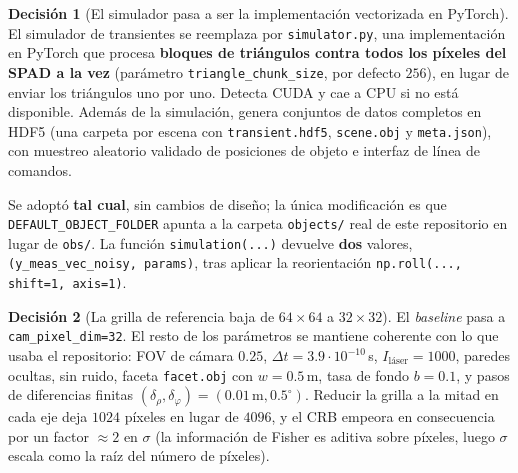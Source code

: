 \documentclass[11pt,a4paper]{article}
\newcommand{\code}[1]{\texttt{#1}}
\theoremstyle{definition}
\newtheorem{decision}{Decisión}
\begin{document}
\begin{decision}[El simulador pasa a ser la implementación vectorizada en
PyTorch]
\label{dec:simulador}
El simulador de transientes se reemplaza por \code{simulator.py}, una
implementación en PyTorch que procesa \textbf{bloques de triángulos contra
todos los píxeles del SPAD a la vez} (parámetro
\code{triangle\_chunk\_size}, por defecto $256$), en lugar de enviar los
triángulos uno por uno. Detecta CUDA y cae a CPU si no está disponible. Además
de la simulación, genera conjuntos de datos completos en HDF5 (una carpeta por
escena con \code{transient.hdf5}, \code{scene.obj} y \code{meta.json}), con
muestreo aleatorio validado de posiciones de objeto e interfaz de línea de
comandos.

Se adoptó \textbf{tal cual}, sin cambios de diseño; la única modificación es
que \code{DEFAULT\_OBJECT\_FOLDER} apunta a la carpeta \code{objects/} real de
este repositorio en lugar de \code{obs/}. La función \code{simulation(...)}
devuelve \textbf{dos} valores, \code{(y\_meas\_vec\_noisy, params)}, tras
aplicar la reorientación \code{np.roll(..., shift=1, axis=1)}.
\end{decision}

\begin{decision}[La grilla de referencia baja de $64\times64$ a $32\times32$]
\label{dec:grilla}
El \emph{baseline} pasa a \code{cam\_pixel\_dim=32}. El resto de los parámetros
se mantiene coherente con lo que usaba el repositorio: FOV de cámara $0.25$,
$\Delta t = 3.9\cdot10^{-10}\,$s, $I_{\text{láser}}=1000$, paredes ocultas, sin
ruido, faceta \code{facet.obj} con $w=0.5\,$m, tasa de fondo $b=0.1$, y pasos de
diferencias finitas $(\delta_\rho,\delta_\varphi)=(0.01\,\text{m},0.5^\circ)$.
Reducir la grilla a la mitad en cada eje deja $1024$ píxeles en lugar de
$4096$, y el CRB empeora en consecuencia por un factor $\approx2$ en $\sigma$
(la información de Fisher es aditiva sobre píxeles, luego $\sigma$ escala como
la raíz del número de píxeles).
\end{decision}
\end{document}
